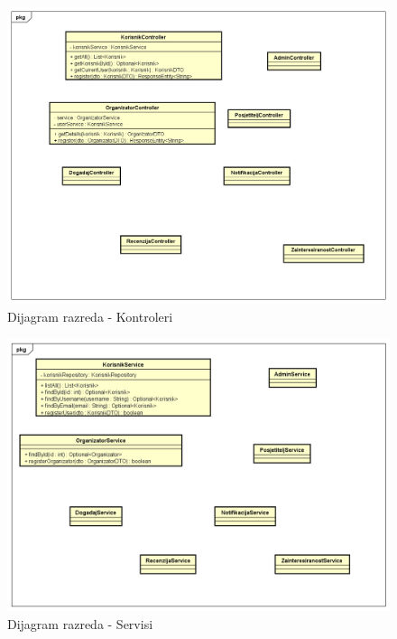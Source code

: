 			\pagebreak
			
			\begin{figure}[H]
				\includegraphics[scale=0.5]{dijagramiKlasa/Dijagram razreda - Kontroleri.png} %
				\centering
				\caption{Dijagram razreda - Kontroleri}
				\label{fig:promjene}
			\end{figure}
			
			\begin{figure}[H]
				\includegraphics[scale=0.5]{dijagramiKlasa/Dijagram razreda - Servisi.png} %
				\centering
				\caption{Dijagram razreda - Servisi}
				\label{fig:promjene}
			\end{figure}
			
